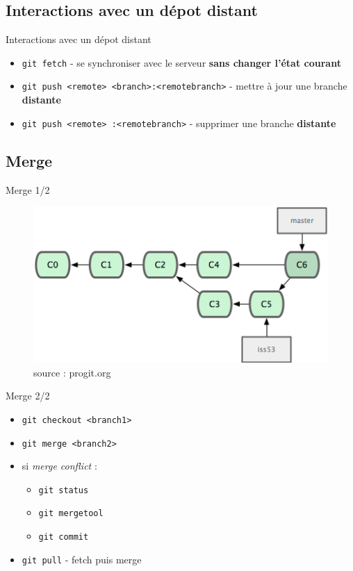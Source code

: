 \documentclass{beamer}
\begin{document}
\subsection*{Interactions avec un dépot distant}
\begin{frame}{Interactions avec un dépot distant}
  \begin{itemize}
  \item \lstinline|git fetch| - se synchroniser avec le serveur
    \textbf{sans changer l'état courant}
  \item \lstinline|git push <remote> <branch>:<remotebranch>| - mettre
    à jour une branche \textbf{distante}
  \item \lstinline|git push <remote> :<remotebranch>| - supprimer une
    branche \textbf{distante}
  \end{itemize}
\end{frame}

\subsection*{Merge}
\begin{frame}{Merge 1/2}
  \begin{figure}
    \begin{center}
      \includegraphics[scale=1]{img/Merge.png}
    \end{center}
    \caption{source : progit.org}
  \end{figure}
\end{frame}

\begin{frame}{Merge 2/2}
  \begin{itemize}
  \item \lstinline|git checkout <branch1>|
  \item \lstinline|git merge <branch2>|
  \item si \emph{merge conflict} :
    \begin{itemize}
    \item[] \lstinline|git status|
    \item[] \lstinline|git mergetool|
    \item[] \lstinline|git commit|
    \end{itemize}
  \item \lstinline|git pull| - fetch puis merge
  \end{itemize}
\end{frame}
\end{document}
